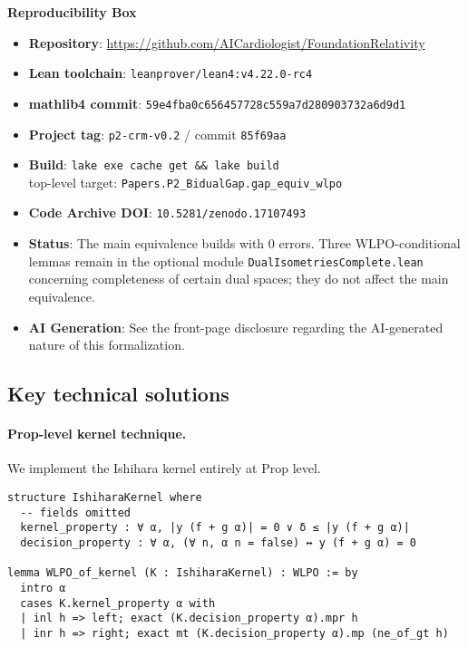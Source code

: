 \documentclass[11pt]{article}
\newcommand{\leanRepo}{\url{https://github.com/AICardiologist/FoundationRelativity}}
\begin{document}
\begin{mdframed}[backgroundcolor=gray!10]
\textbf{Reproducibility Box}
\begin{itemize}
\item \textbf{Repository}: \leanRepo
\item \textbf{Lean toolchain}: \texttt{leanprover/lean4:v4.22.0-rc4}
\item \textbf{mathlib4 commit}: \texttt{59e4fba0c656457728c559a7d280903732a6d9d1}
\item \textbf{Project tag}: \texttt{p2-crm-v0.2} / commit \texttt{85f69aa}
\item \textbf{Build}: \texttt{lake exe cache get \&\& lake build} \\
      top-level target: \texttt{Papers.P2\_BidualGap.gap\_equiv\_wlpo}
\item \textbf{Code Archive DOI}: \texttt{10.5281/zenodo.17107493}
\item \textbf{Status}: The main equivalence builds with 0 errors. Three WLPO-conditional lemmas remain in the optional module \texttt{DualIsometriesComplete.lean} concerning completeness of certain dual spaces; they do not affect the main equivalence.
\item \textbf{AI Generation}: See the front-page disclosure regarding the AI-generated nature of this formalization.
\end{itemize}
\end{mdframed}

\subsection{Key technical solutions}

\paragraph{Prop-level kernel technique.}
We implement the Ishihara kernel entirely at Prop level.

\begin{lstlisting}[caption={Ishihara kernel (illustrative Lean snippet)}]
structure IshiharaKernel where
  -- fields omitted
  kernel_property : ∀ α, |y (f + g α)| = 0 ∨ δ ≤ |y (f + g α)|
  decision_property : ∀ α, (∀ n, α n = false) ↔ y (f + g α) = 0

lemma WLPO_of_kernel (K : IshiharaKernel) : WLPO := by
  intro α
  cases K.kernel_property α with
  | inl h => left; exact (K.decision_property α).mpr h
  | inr h => right; exact mt (K.decision_property α).mp (ne_of_gt h)
\end{lstlisting}
\end{document}
